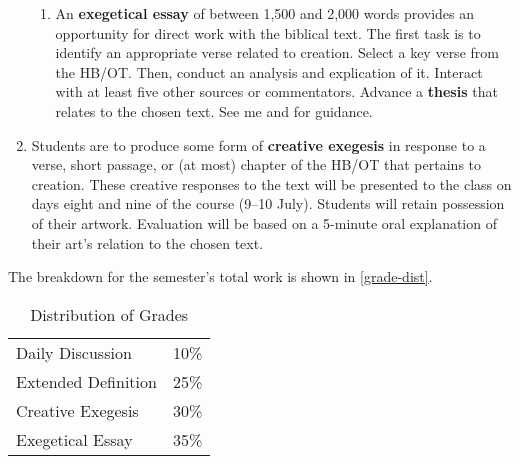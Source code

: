 \documentclass[titlepage]{article}
\newcommand\policy{../policy}
\begin{document}
\begin{enumerate}
\begin{enumerate}
		\item An \textbf{exegetical essay} of between 1,500 and 2,000
		words provides an opportunity for direct work with the biblical
		text. The first task is to identify an appropriate verse related
		to creation. Select a key verse from the HB/OT. Then, conduct an
		analysis and explication of it. Interact with at least five
		other sources or commentators. Advance a \textbf{thesis} that
		relates to the chosen text. See me and \cite[chs 3, 5, 8,
		11]{rlgs} for guidance.

	\end{enumerate}

	\item Students are to produce some form of \textbf{creative
	exegesis} in response to a verse, short passage, or (at most)
	chapter of the HB/OT that pertains to creation. These creative
	responses to the text will be presented to the class on days eight
	and nine of the course (9–10 July). Students will retain possession
	of their artwork. Evaluation will be based on a 5-minute oral
	explanation of their art’s relation to the chosen text.

\end{enumerate}

The breakdown for the semester's total work is shown in
\autoref{grade-dist}.

\begin{table}[htbp]
  \centering
  {\lining
  \begin{tabular}{lr}
    \toprule
    Daily Discussion    & 10\% \\
    Extended Definition & 25\% \\
    Creative Exegesis   & 30\% \\
    Exegetical Essay    & 35\% \\
    \bottomrule
  \end{tabular}}
  \caption{Distribution of Grades}
  \label{grade-dist}
\end{table}




%
\end{document}
